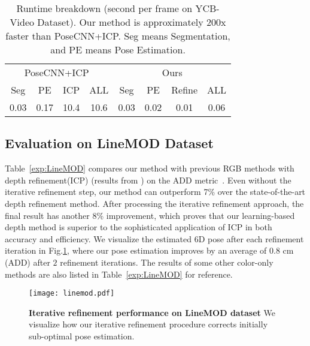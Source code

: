 \documentclass[10pt,twocolumn,letterpaper]{article}
\begin{document}
\begin{table}
\small
\centering
\caption{Runtime breakdown (second per frame on YCB-Video Dataset). Our method is approximately 200x faster than PoseCNN+ICP. Seg means Segmentation, and PE means Pose Estimation.}
\begin{tabular}{cccc|cccc}
\hline
\multicolumn{4}{c|}{PoseCNN+ICP~\cite{xiang2017posecnn}} &
\multicolumn{4}{c}{Ours}\\
 \multicolumn{1}{c}{Seg}        & \multicolumn{1}{c}{PE}        & \multicolumn{1}{c}{ICP} & ALL & \multicolumn{1}{c}{Seg}   & \multicolumn{1}{c}{PE}    & \multicolumn{1}{c}{Refine} & ALL       \\ \hline
\multicolumn{1}{c}{0.03}       & \multicolumn{1}{c}{0.17}       &  \multicolumn{1}{c}{10.4} & 10.6 & \multicolumn{1}{c}{0.03} & \multicolumn{1}{c}{0.02} & \multicolumn{1}{c}{0.01} & 0.06\\ \hline
\end{tabular}
\label{exp:speed}
\end{table}

\subsection{Evaluation on LineMOD Dataset}

Table~\ref{exp:LineMOD} compares our method with previous RGB methods with depth refinement(ICP) (results from \cite{sundermeyer2018implicit, tekin18}) on the ADD metric~\cite{hinterstoisser2012model}. Even without the iterative refinement step, our method can outperform 7\% over the state-of-the-art depth refinement method. After processing the iterative refinement approach, the final result has another 8\% improvement, which proves that our learning-based depth method is superior to the sophisticated application of ICP in both accuracy and efficiency. We visualize the estimated 6D pose after each refinement iteration in Fig.\ref{fig:linemod}, where our pose estimation improves by an average of 0.8 cm (ADD) after $2$ refinement iterations. The results of some other color-only methods are also listed in Table~\ref{exp:LineMOD} for reference.

\begin{figure}
	\centering
	\texttt{[image: linemod.pdf]}
	\caption{\textbf{Iterative refinement performance on LineMOD dataset} We visualize how our iterative refinement procedure corrects initially sub-optimal pose estimation.}
	\label{fig:linemod}
	\vspace{-10pt}
\end{figure}
\end{document}
